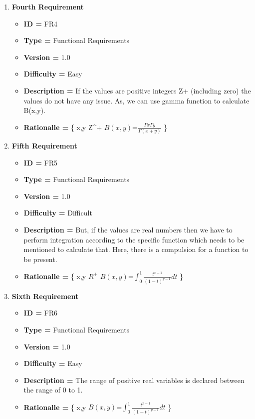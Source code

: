 \documentclass{article}
\begin{document}
\begin{enumerate}[noitemsep]
        \newpage
        \item \textbf{Fourth Requirement}
        \begin{itemize}
            \item \textbf{ID = } FR4
            \item\textbf{Type = } Functional Requirements
            \item\textbf{Version = } 1.0
            \item\textbf{Difficulty = } Easy
            \item\textbf{Description = } If the values are positive integers Z+ (including zero) the values do not have any issue. As, we can use gamma function to calculate B(x,y).
            \item\textbf{Rationalle = } \{ \forall x,y \in Z^+ \mid $B(x,y)$=$\frac{{\Gamma x} {\Gamma y}}{\Gamma (x+y)}$ \}
        \end{itemize}
        
         \newline
        \item \textbf{Fifth Requirement}
        \begin{itemize}
            \item \textbf{ID = } FR5
            \item\textbf{Type = } Functional Requirements
            \item\textbf{Version = } 1.0
            \item\textbf{Difficulty = } Difficult
            \item\textbf{Description = } But, if the values are real numbers then we have to perform integration according to the specific function which needs to be mentioned to calculate that. Here, there is a compulsion for a function to be present.
            \item\textbf{Rationalle = } \{ \forall x,y \in $R^+$ \mid $B(x,y)$=$\int_{0}^{1} \frac{t^{x-1}}{(1-t)^{y-1}} dt$ \}
        \end{itemize}
        
        \newline
        \item \textbf{Sixth Requirement}
        \begin{itemize}
            \item \textbf{ID = } FR6
            \item\textbf{Type = } Functional Requirements
            \item\textbf{Version = } 1.0
            \item\textbf{Difficulty = } Easy
            \item\textbf{Description = } The range of positive real variables is declared between the range of  0 to 1.
            \item\textbf{Rationalle = } \{ \forall x,y \in [0,1] \mid $B(x,y)$=$\int_{0}^{1} \frac{t^{x-1}}{(1-t)^{y-1}} dt$ \} 
        \end{itemize}
        

\end{enumerate}
\end{document}

